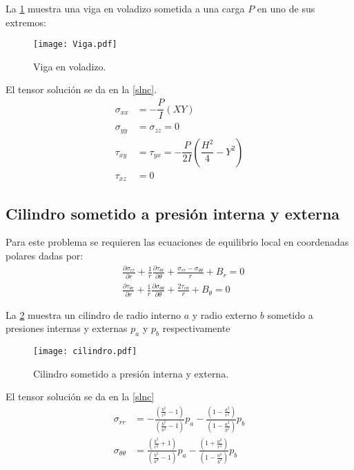 \documentclass[../notas medios.tex]{subfiles}
\begin{document}
La \cref{Viga} muestra una viga en voladizo sometida a una carga $P$ en uno de sus extremos: 
\begin{figure}[H]
\centering
	\texttt{[image: Viga.pdf]}
	\caption{Viga en voladizo.}
	\label{Viga}
\end{figure}

El tensor solución se da en la \cref{slnc}.
\begin{equation}
\begin{split}
{\sigma_{xx}} & = - \dfrac{P}{I} (XY) \\
 {\sigma_{yy} }&= \sigma_{zz} = 0 \\
{\tau_{xy}} & = \tau_{yx} = - \dfrac{P}{2I} (\dfrac{H^2}{4} - Y^2) \\ 
{\tau_{xz}} &= 0
\end{split}	
\label{viga}
\end{equation}


\subsection{Cilindro sometido a presión interna y externa}
Para este problema se requieren las ecuaciones de equilibrio local en coordenadas polares dadas por:
\begin{equation} \label{equcil}
\begin{split}
& \frac{{\partial {\sigma _{rr}}}}{{\partial r}} + \frac{1}{r}\frac{{\partial {\tau _{\theta r}}}}{{\partial \theta }} + \frac{{{\sigma _{rr}} - {\sigma _{\theta \theta }}}}{r} + {B_r} = 0 \\
& \frac{{\partial {\tau _{\theta r}}}}{{\partial r}} + \frac{1}{r}\frac{{\partial {\sigma _{\theta \theta }}}}{{\partial \theta }} + \frac{{2{\tau _{r\theta }}}}{r} + {B_\theta } = 0
\end{split}
\end{equation}

La \cref{cilindro} muestra un cilindro de radio interno $a$ y radio externo $b$ sometido a presiones internas y externas $p_a$ y $p_b$ respectivamente
\begin{figure}[H]
\centering
	\texttt{[image: cilindro.pdf]}
	\caption{Cilindro sometido a presión interna y externa.}
	\label{cilindro}
\end{figure}

El tensor solución se da en la \cref{slnc}\begin{equation}
\begin{split}
\sigma_{rr} & =  - \frac{\left( \frac{b^2}{r^2} - 1 \right)}{\left(\frac{b^2}{a^2} - 1\right)} p_a - \frac{\left(1 - \frac{a^2}{r^2} \right)} {\left(1 - \frac{a^2}{b^2} \right)} p_b \\
\sigma_{\theta\theta} & = \frac{\left(\frac{b^2}{r^2} + 1\right)}{\left(\frac{b^2}{a^2} - 1\right)} p_a - \frac{\left(1 + \frac{a^2}{r^2} \right)}{\left( 1 - \frac{a^2}{b^2}\right)} p_b
\end{split}
\label{slnc}
\end{equation}
\end{document}
